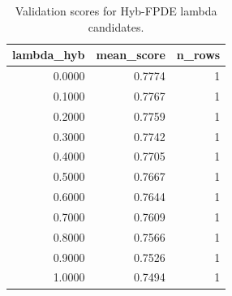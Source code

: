 \begin{table}[t]
\caption{Validation scores for Hyb-FPDE lambda candidates.}
\label{tab:lambda_distribution_computed}
\centering
\begin{tabular}{rrr}
\toprule
lambda\_hyb & mean\_score & n\_rows \\
\midrule
0.0000 & 0.7774 & 1 \\
0.1000 & 0.7767 & 1 \\
0.2000 & 0.7759 & 1 \\
0.3000 & 0.7742 & 1 \\
0.4000 & 0.7705 & 1 \\
0.5000 & 0.7667 & 1 \\
0.6000 & 0.7644 & 1 \\
0.7000 & 0.7609 & 1 \\
0.8000 & 0.7566 & 1 \\
0.9000 & 0.7526 & 1 \\
1.0000 & 0.7494 & 1 \\
\bottomrule
\end{tabular}

\end{table}
